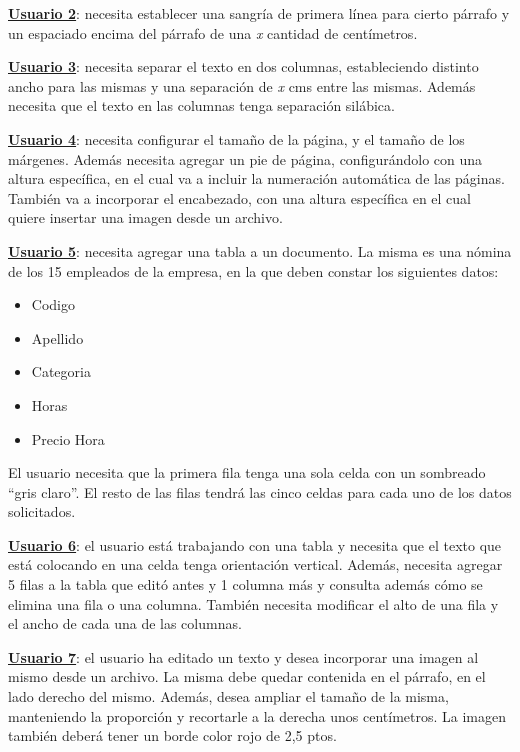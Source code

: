 \documentclass[12pt]{article}
\begin{document}
\textbf{\underline{Usuario 2}}: necesita establecer una sangría de primera línea para cierto párrafo y un espaciado encima del párrafo de una \textit{x} cantidad de centímetros.

\textbf{\underline{Usuario 3}}: necesita separar el texto en dos columnas, estableciendo distinto ancho para las mismas y una separación de \textit{x} cms entre las mismas. Además necesita que el texto en las columnas tenga separación silábica.

\textbf{\underline{Usuario 4}}: necesita configurar el tamaño de la página, y el tamaño de los márgenes. Además necesita agregar un pie de página, configurándolo con una altura específica, en el cual va a incluir la numeración automática de las páginas. También va a incorporar el encabezado, con una altura específica en el cual quiere insertar una imagen desde un archivo.

\textbf{\underline{Usuario 5}}: necesita agregar una tabla a un documento. La misma es una nómina de los 15 empleados de la empresa, en la que deben constar los siguientes datos:
\begin{itemize}
\item Codigo 
\item Apellido 
\item Categoria 
\item Horas 
\item Precio Hora 
\end{itemize}
El usuario necesita que la primera fila tenga una sola celda con un sombreado “gris claro”. El resto de las filas tendrá las cinco celdas para cada uno de los datos solicitados.

\textbf{\underline{Usuario 6}}: el usuario está trabajando con una tabla y necesita que el texto que está colocando en una celda tenga orientación vertical. Además, necesita agregar 5 filas a la tabla que editó antes y 1 columna más y consulta además cómo se elimina una fila o una columna. También necesita modificar el alto de una fila y el ancho de cada una de las columnas.

\textbf{\underline{Usuario 7}}: el usuario ha editado un texto y desea incorporar una imagen al mismo desde un archivo. La misma debe quedar contenida en el párrafo, en el lado derecho del mismo. Además, desea ampliar el tamaño de la misma, manteniendo la proporción y recortarle a la derecha unos centímetros. La imagen también deberá tener un borde color rojo de 2,5 ptos.
\end{document}
